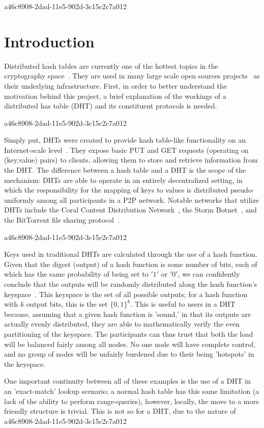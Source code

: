 \documentclass[12pt]{article}
\begin{document}
a46c8908-2dad-11e5-902d-3c15c2c7a012\section{Introduction}
\par Distributed hash tables are currently one of the hottest topics in the cryptography space~\cite{Stoica:2001dj,Rowstron:2001ea,Ratnasamy:2001wn}. They are used in many large scale open sources projects~\cite{Freitas:2013tb,Xu:2010vs,Perfitt:2010fh} as their underlying infrastructure. First, in order to better understand the motivation behind this project, a brief explanation of the workings of a distributed has table (DHT) and its constituent protocols is needed.

a46c8908-2dad-11e5-902d-3c15c2c7a012\par Simply put, DHTs were created to provide hash table-like functionality on an Internet-scale level~\cite{Ratnasamy:2001wn}. They expose basic PUT and GET requests (operating on (key,value) pairs) to clients, allowing them to store and retrieve information from the DHT. The difference between a hash table and a DHT is the scope of the mechanism: DHTs are able to operate in an entirely decentralized setting, in which the responsibility for the mapping of keys to values is distributed pseudo-uniformly among all participants in a P2P network. Notable networks that utilize DHTs include the Coral Content Distribution Network~\cite{Freedman:2004vb}, the Storm Botnet~\cite{Holz:2008uk}, and the BitTorrent file sharing protocol~\cite{Cohen:y1_8mBnw}.

a46c8908-2dad-11e5-902d-3c15c2c7a012\par Keys used in traditional DHTs are calculated through the use of a hash function. Given that the digest (output) of a hash function is some number of bits, each of which has the same probability of being set to $'1'$ or $'0'$, we can confidently conclude that the outputs will be randomly distributed along the hash function's keyspace~. This keyspace is the set of all possible outputs; for a hash function with $k$ output bits, this is the set $\{0,1\}^k$. This is useful to users in a DHT because, assuming that a given hash function is 'sound,' in that its outputs are actually evenly distributed, they are able to mathematically verify the even partitioning of the keyspace. The participants can thus trust that both the load will be balanced fairly among all nodes. No one node will have complete control, and no group of nodes will be unfairly burdened due to their being 'hotspots' in the keyspace.~

\par One important continuity between all of these examples is the use of a DHT in an 'exact-match' lookup scenario; a normal hash table has this same limitation (a lack of the ability to perform range-queries), however, locally, the move to a more friendly structure is trivial. This is not so for a DHT, due to the nature of
\printbibliography
a46c8908-2dad-11e5-902d-3c15c2c7a012
\end{document}
